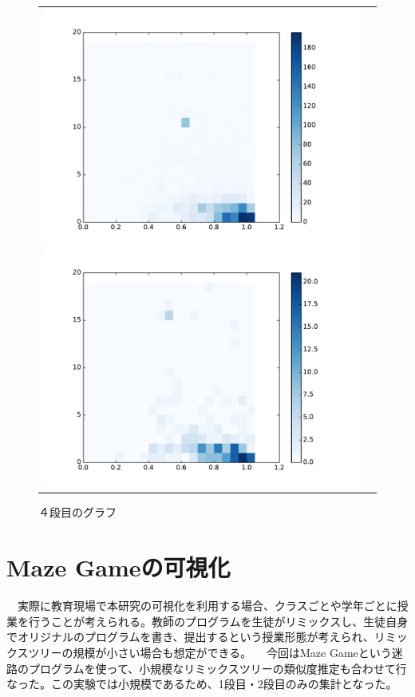 \documentclass[a4paper,10pt,onecolumn,oneside,openany]{jsbook}
\begin{document}
\begin{figure}[h]
\begin{tabular}{cc}
 	\begin{minipage}[t]{0.45\hsize}
	 \centering
	 \includegraphics[keepaspectratio, scale = 0.35]{colormap_splite_3.pdf}
	 \caption{３段目のグラフ}
	 \label{third_splite_color}
	\end{minipage}
        \begin{minipage}[t]{0.45\hsize}
	 \centering
	 \includegraphics[keepaspectratio, scale = 0.35]{colormap_splite_4.pdf}
	 \caption{４段目のグラフ}
	 \label{fourth_splite_color}
	\end{minipage}
 \end{tabular}
 \end{figure}
 
  \newpage
 \section{Maze Gameの可視化}
　実際に教育現場で本研究の可視化を利用する場合、クラスごとや学年ごとに授業を行うことが考えられる。教師のプログラムを生徒がリミックスし、生徒自身でオリジナルのプログラムを書き、提出するという授業形態が考えられ、リミックスツリーの規模が小さい場合も想定ができる。
　今回はMaze Gameという迷路のプログラムを使って、小規模なリミックスツリーの類似度推定も合わせて行なった。この実験では小規模であるため、1段目・2段目のみの集計となった。
\end{document}
